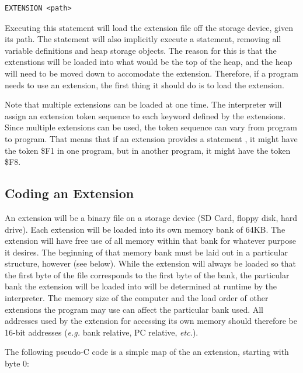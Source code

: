 \documentclass{report}
\begin{document}
    \begin{verbatim}
EXTENSION <path>        
    \end{verbatim}

    Executing this statement will load the extension file off the storage device, given its path.
    The statement will also implicitly execute a  statement, removing all variable
    definitions and heap storage objects. The reason for this is that the extenstions will be loaded
    into what would be the top of the heap, and the heap will need to be moved down to accomodate
    the extension. Therefore, if a program needs to use an extension, the first thing it should do
    is to load the extension.

    Note that multiple extensions can be loaded at one time. The interpreter will assign an extension
    token sequence to each keyword defined by the extensions. Since multiple extensions can be used,
    the token sequence can vary from program to program. That means that if an extension provides a
    statement , it might have the token \$F1 in one program, but in another program, it
    might have the token \$F8.

    \subsection*{Coding an Extension}
    
    An extension will be a binary file on a storage device (SD Card, floppy disk, hard drive). Each
    extension will be loaded into its own memory bank of 64KB. The extension will have free use of all
    memory within that bank for whatever purpose it desires. The beginning of that memory bank must be
    laid out in a particular structure, however (see below). While the extension will always be loaded so
    that the first byte of the file corresponds to the first byte of the bank, the particular bank the
    extension will be loaded into will be determined at runtime by the interpreter. The memory size of
    the computer and the load order of other extensions the program may use can affect the particular
    bank used. All addresses used by the extension for accessing its own memory should therefore be
    16-bit addresses ({\it e.g.} bank relative, PC relative, {\it etc.}).

    The following pseudo-C code is a simple map of the an extension, starting with byte 0:
\end{document}

